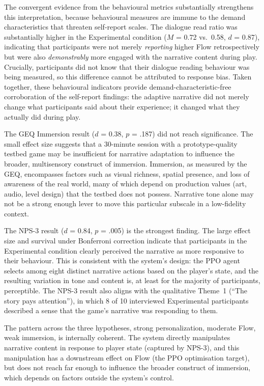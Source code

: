 The convergent evidence from the behavioural metrics substantially strengthens this interpretation, because behavioural measures are immune to the demand characteristics that threaten self-report scales. The dialogue read ratio was substantially higher in the Experimental condition ($M$ = 0.72 vs.\ 0.58, $d$ = 0.87), indicating that participants were not merely \textit{reporting} higher Flow retrospectively but were also \textit{demonstrably} more engaged with the narrative content during play. Crucially, participants did not know that their dialogue reading behaviour was being measured, so this difference cannot be attributed to response bias. Taken together, these behavioural indicators provide demand-characteristic-free corroboration of the self-report findings: the adaptive narrative did not merely change what participants said about their experience; it changed what they actually did during play.

The GEQ Immersion result ($d$ = 0.38, $p$ = .187) did not reach significance. The small effect size suggests that a 30-minute session with a prototype-quality testbed game may be insufficient for narrative adaptation to influence the broader, multisensory construct of immersion. Immersion, as measured by the GEQ, encompasses factors such as visual richness, spatial presence, and loss of awareness of the real world, many of which depend on production values (art, audio, level design) that the testbed does not possess. Narrative tone alone may not be a strong enough lever to move this particular subscale in a low-fidelity context.

The NPS-3 result ($d$ = 0.84, $p$ = .005) is the strongest finding. The large effect size and survival under Bonferroni correction indicate that participants in the Experimental condition clearly perceived the narrative as more responsive to their behaviour. This is consistent with the system's design: the PPO agent selects among eight distinct narrative actions based on the player's state, and the resulting variation in tone and content is, at least for the majority of participants, perceptible. The NPS-3 result also aligns with the qualitative Theme~1 (``The story pays attention''), in which 8 of 10 interviewed Experimental participants described a sense that the game's narrative was responding to them.

The pattern across the three hypotheses, strong personalization, moderate Flow, weak immersion, is internally coherent. The system directly manipulates narrative content in response to player state (captured by NPS-3), and this manipulation has a downstream effect on Flow (the PPO optimisation target), but does not reach far enough to influence the broader construct of immersion, which depends on factors outside the system's control.

